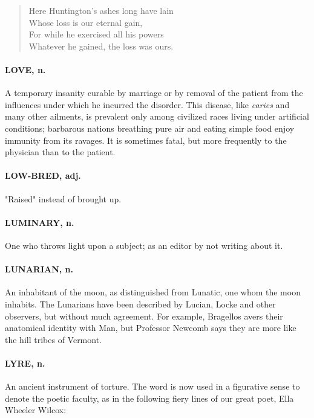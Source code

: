 \documentclass[11pt]{article}
\begin{document}
\begin{quote}   Here Huntington's ashes long have lain \\
  Whose loss is our eternal gain, \\
  For while he exercised all his powers \\
  Whatever he gained, the loss was ours.  \end{quote}

\paragraph{LOVE, n.}  A temporary insanity curable by marriage or by removal of
the patient from the influences under which he incurred the disorder.
This disease, like {\em caries} and many other ailments, is prevalent only
among civilized races living under artificial conditions; barbarous
nations breathing pure air and eating simple food enjoy immunity from
its ravages.  It is sometimes fatal, but more frequently to the
physician than to the patient.

\paragraph{LOW-BRED, adj.}  "Raised" instead of brought up.

\paragraph{LUMINARY, n.}  One who throws light upon a subject; as an editor by not
writing about it.

\paragraph{LUNARIAN, n.}  An inhabitant of the moon, as distinguished from
Lunatic, one whom the moon inhabits.  The Lunarians have been
described by Lucian, Locke and other observers, but without much
agreement.  For example, Bragellos avers their anatomical identity
with Man, but Professor Newcomb says they are more like the hill
tribes of Vermont.

\paragraph{LYRE, n.}  An ancient instrument of torture.  The word is now used in a
figurative sense to denote the poetic faculty, as in the following
fiery lines of our great poet, Ella Wheeler Wilcox:
\end{document}
